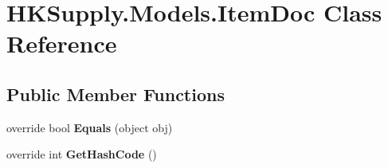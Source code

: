 \hypertarget{class_h_k_supply_1_1_models_1_1_item_doc}{}\section{H\+K\+Supply.\+Models.\+Item\+Doc Class Reference}
\label{class_h_k_supply_1_1_models_1_1_item_doc}
\subsection*{Public Member Functions}
\begin{DoxyCompactItemize}
\item 
\mbox{\label{class_h_k_supply_1_1_models_1_1_item_doc_a595741e01071d4e478116c5bc248e4ad}} 
override bool {\bfseries Equals} (object obj)
\item 
\mbox{\label{class_h_k_supply_1_1_models_1_1_item_doc_aa50dc84afead7201a7aaa13f8f429dc0}} 
override int {\bfseries Get\+Hash\+Code} ()
\end{DoxyCompactItemize}
